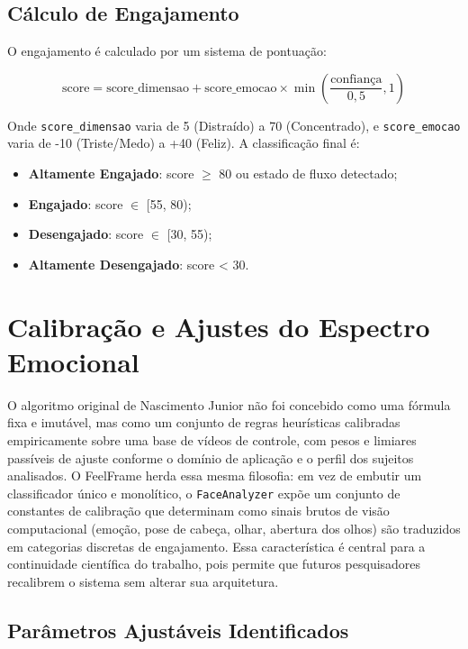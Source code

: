 \documentclass[
	12pt,
	openright,
	oneside,
	a4paper,
	english,
	brazil
	]{abntex2}
\begin{document}
\subsection{Cálculo de Engajamento}

O engajamento é calculado por um sistema de pontuação:

\begin{equation}
\text{score} = \text{score\_dimensao} + \text{score\_emocao} \times \min\left(\frac{\text{confiança}}{0,5}, 1\right)
\end{equation}

Onde \texttt{score\_dimensao} varia de 5 (Distraído) a 70 (Concentrado), e \texttt{score\_emocao} varia de -10 (Triste/Medo) a +40 (Feliz). A classificação final é:
\begin{itemize}
    \item \textbf{Altamente Engajado}: score $\geq$ 80 ou estado de fluxo detectado;
    \item \textbf{Engajado}: score $\in$ [55, 80);
    \item \textbf{Desengajado}: score $\in$ [30, 55);
    \item \textbf{Altamente Desengajado}: score < 30.
\end{itemize}

\section{Calibração e Ajustes do Espectro Emocional}
\label{sec:calibracao_espectro}

O algoritmo original de Nascimento Junior \cite{nascimento2024nelson} não foi concebido como uma fórmula fixa e imutável, mas como um conjunto de regras heurísticas calibradas empiricamente sobre uma base de vídeos de controle, com pesos e limiares passíveis de ajuste conforme o domínio de aplicação e o perfil dos sujeitos analisados. O FeelFrame herda essa mesma filosofia: em vez de embutir um classificador único e monolítico, o \texttt{FaceAnalyzer} expõe um conjunto de constantes de calibração que determinam como sinais brutos de visão computacional (emoção, pose de cabeça, olhar, abertura dos olhos) são traduzidos em categorias discretas de engajamento. Essa característica é central para a continuidade científica do trabalho, pois permite que futuros pesquisadores recalibrem o sistema sem alterar sua arquitetura.

\subsection{Parâmetros Ajustáveis Identificados}
\end{document}
